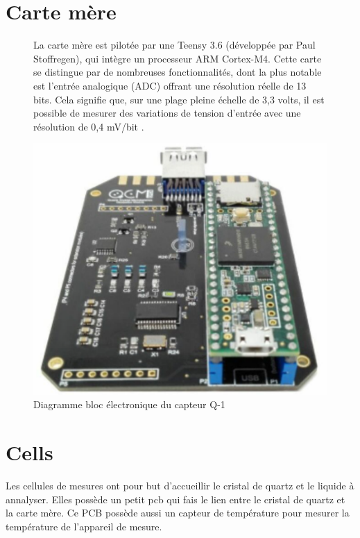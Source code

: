 \section{Carte mère}
\begin{figure}[H]
    \centering
    \begin{minipage}{0.48\textwidth}
        \small
        La carte mère est pilotée par une Teensy 3.6 (développée par Paul Stoffregen), 
        qui intègre un processeur ARM Cortex-M4. Cette carte se distingue par de nombreuses fonctionnalités, 
        dont la plus notable est l'entrée analogique (ADC) offrant une résolution réelle de 13 bits. 
        Cela signifie que, sur une plage pleine échelle de 3,3 volts, il est possible de mesurer des variations de tension d’entrée avec une résolution de 0,4 mV/bit \cite{manual-openqcmQ1}.
    \end{minipage}\hfill
    \begin{minipage}{0.48\textwidth}
        \centering
        \includegraphics[width=\textwidth]{assets/figures/Quartz-Crystal-Microbalance-openQCM-Q-1-Shield-Photo.png}
        \caption{Diagramme bloc électronique du capteur Q-1}
        \label{fig:bloc diagram Q-1}
    \end{minipage}
\end{figure}

\section{Cells}
Les cellules de mesures ont pour but d'accueillir le cristal de quartz et le liquide à annalyser.
Elles possède un petit pcb qui fais le lien entre le cristal de quartz et la carte mère.
Ce PCB possède aussi un capteur de température pour mesurer la température de l'appareil de mesure.


